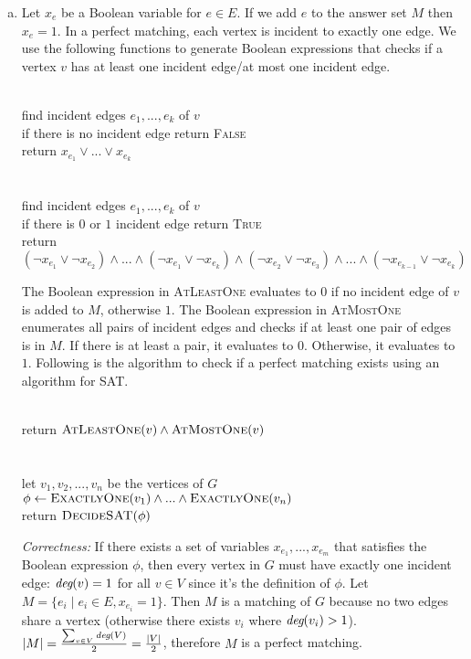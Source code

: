 \documentclass[11pt]{article}
\begin{document}

\begin{solution}
\begin{enumerate}[(a)]
\item Let $x_e$ be a Boolean variable for $e\in E$. If we add $e$ to the answer set $M$ then $x_e=1$. In a perfect matching, each vertex is incident to exactly one edge. We use the following functions to generate Boolean expressions that checks if a vertex $v$ has at least one incident edge/at most one incident edge.
\begin{algo}
	\textsc{}\+
\\	find incident edges $e_1, ..., e_k$ of $v$
\\	if there is no incident edge return \textsc{False}
\\	return $x_{e_1}\lor ... \lor x_{e_k}$\-
\\
\\	\textsc{}\+
\\	find incident edges $e_1, ..., e_k$ of $v$
\\	if there is $0$ or $1$ incident edge return \textsc{True}
\\	return $(\lnot x_{e_1}\lor \lnot x_{e_2})\land...\land(\lnot x_{e_1}\lor \lnot x_{e_k})\land(\lnot x_{e_2}\lor \lnot x_{e_3})\land...\land(\lnot x_{e_{k-1}}\lor \lnot x_{e_k})$
\end{algo}
The Boolean expression in \textsc{AtLeastOne} evaluates to $0$ if no incident edge of $v$ is added to $M$, otherwise $1$. The Boolean expression in \textsc{AtMostOne} enumerates all pairs of incident edges and checks if at least one pair of edges is in $M$. If there is at least a pair, it evaluates to $0$. Otherwise, it evaluates to $1$. Following is the algorithm to check if a perfect matching exists using an algorithm for SAT.
\begin{algo}
	\textsc{}\+
\\	return $\textsc{AtLeastOne}(v) \land \textsc{AtMostOne}(v)$\-
\\
\\	\textsc{}\+
\\	let $v_1, v_2, ..., v_n$ be the vertices of $G$
\\	$\phi\gets \textsc{ExactlyOne}(v_1) \land ... \land \textsc{ExactlyOne}(v_n)$
\\	return $\textsc{DecideSAT}(\phi)$
\end{algo}
\emph{Correctness:} If there exists a set of variables $x_{e_1},...,x_{e_m}$ that satisfies the Boolean expression $\phi$, then every vertex in $G$ must have exactly one incident edge: $\emph{deg}(v)=1$ for all $v\in V$ since it's the definition of $\phi$. Let $M=\{e_i\mid e_i\in E, x_{e_i}=1\}$. Then $M$ is a matching of $G$ because no two edges share a vertex (otherwise there exists $v_i$ where $\emph{deg}(v_i)>1$). $|M|=\frac{\sum_{v\in V}{\emph{deg}(V)}}{2}=\frac{|V|}{2}$, therefore $M$ is a perfect matching.


\end{enumerate}
\end{solution}
\end{document}
